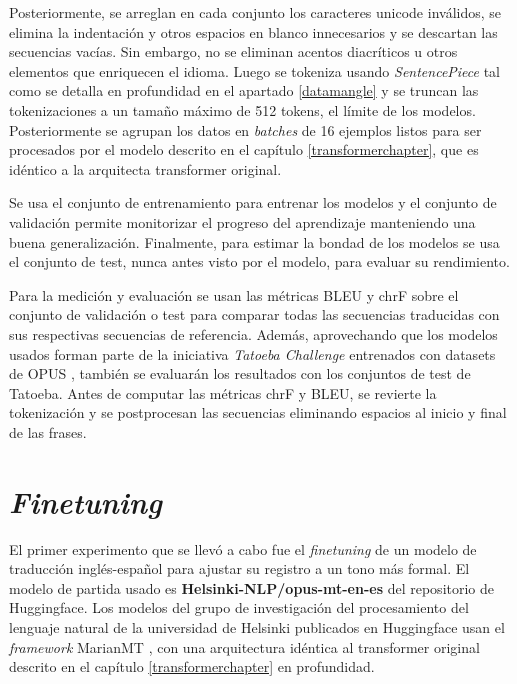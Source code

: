 Posteriormente, se arreglan en cada conjunto los caracteres unicode inválidos, se elimina la indentación y otros espacios en blanco innecesarios y se descartan las secuencias vacías. Sin embargo, no se eliminan acentos diacríticos u otros elementos que enriquecen el idioma. Luego se tokeniza usando \textit{SentencePiece} tal como se detalla en profundidad en el apartado \ref{datamangle} y se truncan las tokenizaciones a un tamaño máximo de 512 tokens, el límite de los modelos. Posteriormente se agrupan los datos en \textit{batches} de 16 ejemplos listos para ser procesados por el modelo descrito en el capítulo \ref{transformerchapter}, que es idéntico a la arquitecta transformer original.

Se usa el conjunto de entrenamiento para entrenar los modelos y el conjunto de validación permite monitorizar el progreso del aprendizaje manteniendo una buena generalización. Finalmente, para estimar la bondad de los modelos se usa el conjunto de test, nunca antes visto por el modelo, para evaluar su rendimiento.

Para la medición y evaluación se usan las métricas BLEU y chrF sobre el conjunto de validación o test para comparar todas las secuencias traducidas con sus respectivas secuencias de referencia.
Además, aprovechando que los modelos usados forman parte de la iniciativa \textit{Tatoeba Challenge} \cite{tiedemann-2020-tatoeba} entrenados con datasets de OPUS \cite{CORPUS}, también se evaluarán los resultados con los conjuntos de test de Tatoeba.
Antes de computar las métricas chrF y BLEU, se revierte la tokenización y se postprocesan las secuencias eliminando espacios al inicio y final de las frases.


\section{\textit{Finetuning}}\label{finetune}
El primer experimento que se llevó a cabo fue el \textit{finetuning} de un modelo de traducción inglés-español para ajustar su registro a un tono más formal.
El modelo de partida usado es \textbf{Helsinki-NLP/opus-mt-en-es} del repositorio de Huggingface.
Los modelos del grupo de investigación del procesamiento del lenguaje natural de la universidad de Helsinki publicados en Huggingface usan el \textit{framework} MarianMT \cite{Junczys-Dowmunt2018Apr}, con una arquitectura idéntica al transformer original descrito en el capítulo \ref{transformerchapter} en profundidad.


